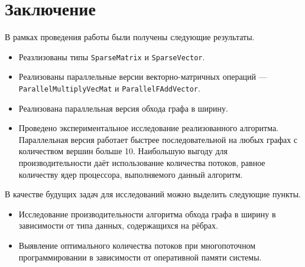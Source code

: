 
\section*{Заключение}
В рамках проведения работы были получены следующие результаты.

\begin{itemize}
\item Реазлизованы типы \texttt{SparseMatrix} и \texttt{SparseVector}.
\item Реализованы параллельные версии векторно-матричных операций --- \texttt{ParallelMultiplyVecMat} и \texttt{ParallelFAddVector}.
\item Реализована параллельная версия обхода графа в ширину.
\item Проведено экспериментальное исследование реализованного алгоритма. Параллельная версия работает быстрее последовательной на любых графах с количеством вершин больше 10. Наибольшую выгоду для производительности даёт использование количества потоков, равное количеству ядер процессора, выполняемого данный алгоритм.
\end{itemize}
\noindent В качестве будущих задач для исследований можно выделить следующие пункты.
\begin{itemize}
\item Исследование производительности алгоритма обхода графа в ширину в зависимости от типа данных, содержащихся на рёбрах.
\item Выявление оптимального количества потоков при многопоточном программировании в зависимости от оперативной памяти системы.
\end{itemize}

